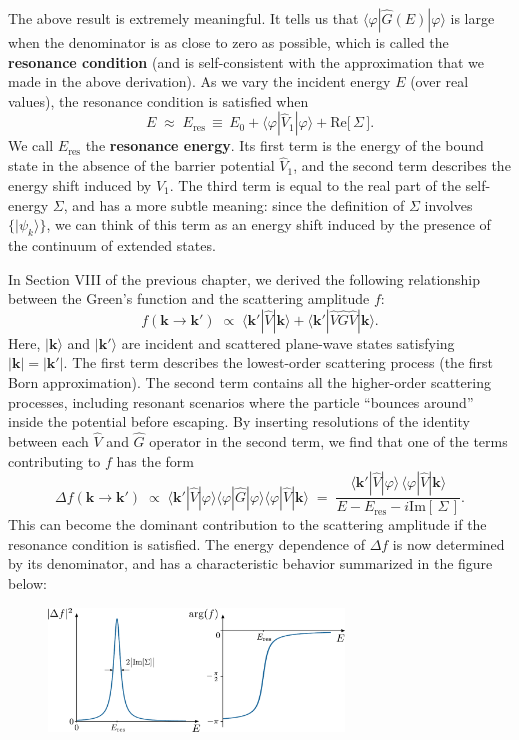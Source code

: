 \documentclass[pra,12pt]{revtex4}
\begin{document}
The above result is extremely meaningful.  It tells us that
$\langle\varphi|\hat{G}(E)|\varphi\rangle$ is large when the
denominator is as close to zero as possible, which is called the
\textbf{resonance condition} (and is self-consistent with the
approximation that we made in the above derivation).  As we vary the
incident energy $E$ (over real values), the resonance condition is
satisfied when
$$E \;\approx\; E_{\mathrm{res}} \,\equiv\, E_0 + \langle\varphi|\hat{V}_1|\varphi\rangle + \mathrm{Re}\big[\,\Sigma\,\big].$$
We call $E_{\mathrm{res}}$ the \textbf{resonance energy}.  Its first
term is the energy of the bound state in the absence of the barrier
potential $\hat{V}_1$, and the second term describes the energy shift
induced by $\hat{V}_1$.  The third term is equal to the real part of
the self-energy $\Sigma$, and has a more subtle meaning: since the
definition of $\Sigma$ involves $\{|\psi_k\rangle\}$, we can think of
this term as an energy shift induced by the presence of the continuum
of extended states.

In Section VIII of the previous chapter, we derived the following
relationship between the Green's function and the scattering amplitude
$f$:
$$f(\mathbf{k}\rightarrow\mathbf{k}') \;\propto\; \langle \mathbf{k}'|\hat{V}|\mathbf{k}\rangle + \langle \mathbf{k}'|\hat{V}\hat{G}\hat{V}|\mathbf{k}\rangle.$$
Here, $|\mathbf{k}\rangle$ and $|\mathbf{k}'\rangle$ are incident and
scattered plane-wave states satisfying $|\mathbf{k}|=|\mathbf{k}'|$.
The first term describes the lowest-order scattering process (the
first Born approximation).  The second term contains all the
higher-order scattering processes, including resonant scenarios where
the particle ``bounces around'' inside the potential before escaping.
By inserting resolutions of the identity between each $\hat{V}$ and
$\hat{G}$ operator in the second term, we find that one of the terms
contributing to $f$ has the form
$$\Delta f(\mathbf{k}\rightarrow\mathbf{k}') \;\propto\; \langle \mathbf{k}'|\hat{V}|\varphi\rangle\langle\varphi|\hat{G}|\varphi\rangle\langle\varphi|\hat{V}|\mathbf{k}\rangle \;=\; \frac{\langle \mathbf{k}'|\hat{V}|\varphi\rangle \, \langle\varphi|\hat{V}|\mathbf{k}\rangle}{\displaystyle E - E_{\mathrm{res}} - i \mathrm{Im}[\,\Sigma\,]}.$$
This can become the dominant contribution to the scattering amplitude
if the resonance condition is satisfied.  The energy dependence of
$\Delta f$ is now determined by its denominator, and has a
characteristic behavior summarized in the figure below:

\begin{figure}[h]
  \centering\includegraphics[width=0.7\textwidth]{resonance}
\end{figure}
\end{document}
